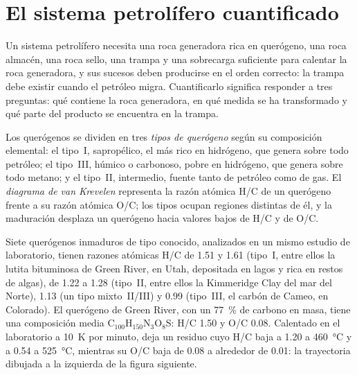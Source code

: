 \section{El sistema petrolífero cuantificado}\label{sec:b2:energy-geology:petroleum}

Un sistema petrolífero necesita una roca generadora rica en querógeno, una roca almacén, una roca sello, una trampa y una
sobrecarga suficiente para calentar la roca generadora, y sus sucesos deben producirse en el orden correcto: la trampa debe
existir cuando el petróleo migra. Cuantificarlo significa responder a tres preguntas: qué 
contiene la roca generadora, en qué medida se ha transformado y qué parte del producto se encuentra en la
trampa.

\begin{definition}\label{def:b2:energy-geology:kerogen}
Los querógenos se dividen en tres \emph{tipos de querógeno} según su composición elemental:
el tipo~I, sapropélico, el más rico en hidrógeno, que genera sobre todo petróleo; el tipo~III, húmico o carbonoso,
pobre en hidrógeno, que genera sobre todo metano; y el tipo~II, intermedio, fuente tanto de petróleo
como de gas. El \emph{diagrama de van Krevelen} representa la razón atómica H/C de
un querógeno frente a su razón atómica O/C; los tipos ocupan regiones distintas de él, y la maduración
desplaza un querógeno hacia valores bajos de H/C y de O/C.
\end{definition}

Siete querógenos inmaduros de tipo conocido, analizados en un mismo estudio de laboratorio, tienen razones atómicas H/C de
1.51 y 1.61 (tipo~I, entre ellos la lutita bituminosa de Green River, en Utah, depositada en lagos y rica en
restos de algas), de 1.22 a 1.28 (tipo~II, entre ellos la Kimmeridge Clay del mar del Norte),
1.13 (un tipo mixto~II/III) y 0.99 (tipo~III, el carbón de Cameo, en Colorado). El querógeno de Green
River, con un \qty{77}{\percent} de carbono en masa, tiene una composición media C$_{100}$H$_{150}$N$_3$O$_8$S: H/C 1.50 y
O/C 0.08. Calentado en el laboratorio a \qty{10}{K} por minuto, deja un residuo cuyo H/C baja a
1.20 a \qty{460}{\celsius} y a 0.54 a \qty{525}{\celsius}, mientras su O/C baja de 0.08 a alrededor de
0.01: la trayectoria dibujada a la izquierda de la figura siguiente.

